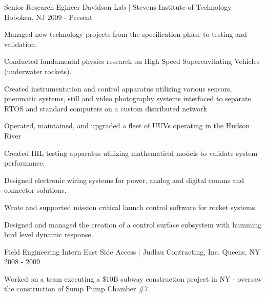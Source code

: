 

\begin{cventries}

  \cventry
    {Senior Research Egineer} %
    {Davidson Lab | Stevens Institute of Technology} %
    {Hoboken, NJ} %
    {2009 - Present} %
    {
      \begin{cvitems} %
        \item {Managed new technology projects from the specification phase to
                testing and validation.} 
        \item {Conducted fundamental physics
                research on High Speed Supercavitating Vehicles (underwater
                rockets).}
        \item {Created instrumentation and control apparatus utilizing various
            sensors, pneumatic systems, still and video photography systems
            interfaced to separate RTOS and standard computers on a custom
            distributed network} 
        \item {Operated, maintained, and upgraded a fleet of UUVs operating in
            the Hudson River}
        \item {Created HIL testing apparatus utilizing mathematical models to
            validate system performance.} 
        \item {Designed electronic wiring systems for power, analog and digital
            comms and connector solutions.}
        \item {Wrote and supported mission critical launch control software for
            rocket systems.} \item {Designed and managed the creation of a
            control surface subsystem with humming bird level dynamic response.}
      \end{cvitems}
    }

  \cventry
    {Field Engineering Intern} %
    {East Side Access | Judlau Contracting, Inc.} %
    {Queens, NY} %
    {2008 - 2009} %
    {%
      \begin{cvitems} %
        \item {Worked on a team executing a \$10B subway construction project in
            NY - oversaw the construction of Sump Pump Chamber \#7.}
      \end{cvitems}
    }


\end{cventries}
